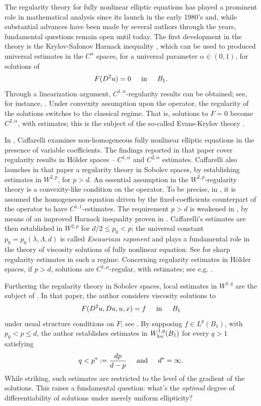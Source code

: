 \documentclass[10pt]{article} %
\begin{document}
The regularity theory for fully nonlinear elliptic equations has played a prominent role in mathematical analysis since its launch in the early 1980's and, while substantial advances have been made by several authors through the years, fundamental questions remain open until today. The first development in the theory is the Krylov-Safonov Harnack inequality \cite{krysaf}, which can be used to produced universal estimates in the $C^\alpha$ spaces, for a universal parameter $\alpha\in(0,1)$, for {solutions} of 
\[
	F(D^2u)=0\hspace{.2in}\mbox{in}\hspace{.2in} B_1.
\]
Through a linearization argument, $C^{1,\alpha}$-regularity results can be obtained; see, for instance, \cite{caf, trudinger}. Under convexity assumption upon the operator, the regularity of the solutions switches to the classical regime. That is, solutions to $F=0$ become $C^{2,\alpha}$, with estimates; this is the subject of the so-called Evans-Krylov theory \cite{krylovc2a}. 

In \cite{caf}, Caffarelli examines non-homogeneous fully nonlinear elliptic equations in the presence of variable coefficients. The findings reported in that paper cover regularity results in H\"older spaces -- $C^{1,\alpha}$ and $C^{2,\alpha}$ estimates. Caffarelli also launches in that paper a regularity theory in Sobolev spaces, by establishing estimates in $W^{2,p}$, for $p>d$. An essential assumption in the $W^{2,p}$-regularity theory is a convexity-like condition on the operator. To be precise, in \cite{caf}, it is assumed the homogeneous equation driven by the fixed-coefficients counterpart of the operator to have $C^{1,1}$-estimates. %
%
The requirement $p>d$ is weakened in \cite{escauriaza}, by means of an improved Harnack inequality proven in \cite{fabesstroock}. Caffarelli's estimates are then established in $W^{2,p}$ for $d/2\leq p_0<p$; the universal constant $p_0=p_0(\lambda,\Lambda,d)$ is called \emph{Escauriaza exponent} and plays a fundamental role in the theory of viscosity solutions of fully nonlinear equation. See \cite{M5} for sharp regularity estimates in such a regime. Concerning regularity estimates in H\"older spaces, if $p>d$, solutions are $C^{1,\mu}$-regular, with estimates; see e.g. \cite{caf, cafcab, M5, S}.

Furthering the regularity theory in Sobolev spaces, local estimates in $W^{1,q}$ are the subject of \cite{S}. In that paper, the author considers viscosity solutions to 
\[
	F(D^2u,Du,u,x)=f\hspace{.2in}\mbox{in}\hspace{.2in}B_1
\]
under usual structure conditions on $F$; see \cite{CCKS}. By supposing $f\in L^p(B_1)$, with $p_0<p\le d$, the author establishes estimates in $W^{1,q}_{{\rm loc}}(B_1)$ for every $q>1$ satisfying
\[
	q<p^*:=\frac{dp}{d-p}\hspace{.2in}\mbox{and}\hspace{.2in}d^*=\infty.
\]
While striking, such estimates are restricted to the level of the gradient of the solutions. This raises a fundamental question: what's the \emph{optimal}  degree of differentiability of solutions under merely uniform ellipticity? 
\end{document}
